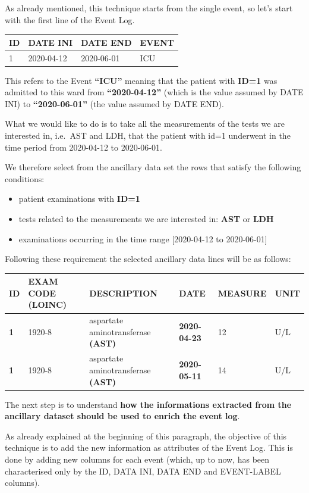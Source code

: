 \documentclass[
]{book}
\providecommand{\tightlist}{%
  \setlength{\itemsep}{0pt}\setlength{\parskip}{0pt}}
\begin{document}
As already mentioned, this technique starts from the single event, so let's start with the first line of the Event Log.

\begin{longtable}[]{@{}llll@{}}
\toprule
ID & DATE INI & DATE END & EVENT \\
\midrule
\endhead
1 & 2020-04-12 & 2020-06-01 & ICU \\
\bottomrule
\end{longtable}

This refers to the Event \textbf{``ICU''} meaning that the patient with \textbf{ID=1} was admitted to this ward from \textbf{``2020-04-12''} (which is the value assumed by DATE INI) to \textbf{``2020-06-01''} (the value assumed by DATE END).

What we would like to do is to take all the measurements of the tests we are interested in, i.e.~AST and LDH, that the patient with id=1 underwent in the time period from 2020-04-12 to 2020-06-01.

We therefore select from the ancillary data set the rows that satisfy the following conditions:

\begin{itemize}
\tightlist
\item
  patient examinations with \textbf{ID=1}
\item
  tests related to the measurements we are interested in: \textbf{AST} or \textbf{LDH}
\item
  examinations occurring in the time range {[}2020-04-12 to 2020-06-01{]}
\end{itemize}

Following these requirement the selected ancillary data lines will be as follows:

\begin{longtable}[]{@{}llllll@{}}
\toprule
ID & EXAM CODE (LOINC) & DESCRIPTION & DATE & MEASURE & UNIT \\
\midrule
\endhead
\textbf{1} & 1920-8 & aspartate aminotransferase \textbf{(AST)} & \textbf{2020-04-23} & 12 & U/L \\
\textbf{1} & 1920-8 & aspartate aminotransferase \textbf{(AST)} & \textbf{2020-05-11} & 14 & U/L \\
\bottomrule
\end{longtable}

The next step is to understand \textbf{how the informations extracted from the ancillary dataset should be used to enrich the event log}.

As already explained at the beginning of this paragraph, the objective of this technique is to add the new information as attributes of the Event Log.
This is done by adding new columns for each event (which, up to now, has been characterised only by the ID, DATA INI, DATA END and EVENT-LABEL columns).
\end{document}
